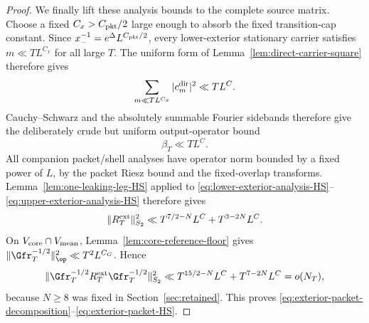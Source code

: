 \begin{proof}
We finally lift these analysis bounds to the complete source matrix.  Choose a
fixed $C_x>C_{\rm pkt}/2$ large enough to absorb the fixed transition-cap
constant.  Since $x_-^{-1}=e^\Delta L^{C_{\rm pkt}/2}$, every lower-exterior
stationary carrier satisfies $m\ll T L^{C_x}$ for all large $T$.  The uniform
form of Lemma~\ref{lem:direct-carrier-square} therefore gives
\[
\sum_{m\ll T L^{C_x}}|c_m^{\rm dir}|^2
\ll T L^{C}.
\]
Cauchy--Schwarz and the absolutely summable Fourier sidebands therefore give
the deliberately crude but uniform output-operator bound
\begin{equation}
\boxed{\beta_T\ll T L^{C}.}
\label{eq:exterior-source-operator-bound}
\end{equation}
All companion packet/shell analyses have operator norm bounded by a fixed
power of $L$, by the packet Riesz bound and the fixed-overlap transforms.
Lemma~\ref{lem:one-leaking-leg-HS} applied to
\eqref{eq:lower-exterior-analysis-HS}--\eqref{eq:upper-exterior-analysis-HS}
therefore gives
\[
\|R_T^{\rm ext}\|_{S_2}^2
\ll T^{7/2-N}L^C+T^{3-2N}L^C.
\]
On $V_{\rm core}\cap V_{\rm mean}$,
Lemma~\ref{lem:core-reference-floor} gives
$\|\Gfr_T^{-1/2}\|_{\op}^2\ll T^2L^{C_G}$. Hence
\[
\|\Gfr_T^{-1/2}R_T^{\rm ext}\Gfr_T^{-1/2}\|_{S_2}^2
\ll T^{15/2-N}L^C+T^{7-2N}L^C=o(N_T),
\]
because $N\ge8$ was fixed in Section~\ref{sec:retained}. This proves
\eqref{eq:exterior-packet-decomposition}--\eqref{eq:exterior-packet-HS}.
\end{proof}

